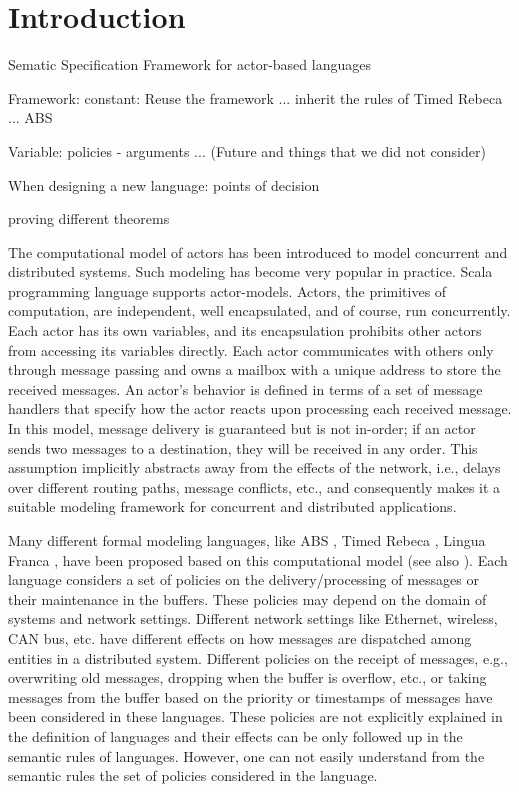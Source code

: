 \section{Introduction}

Sematic Specification Framework for actor-based languages

Framework:
constant: Reuse the framework ...
inherit the rules of Timed Rebeca ... ABS 

Variable: policies - arguments ...
(Future and things that we did not consider)

When designing a new language: points of decision 

proving different theorems

The computational model of actors \cite{Hewitt77,Agha90} has been introduced to model concurrent and distributed systems. Such modeling has become very popular in practice. Scala programming language supports actor-models. Actors, the primitives of computation, are independent, well encapsulated, and of course, run concurrently. Each actor has its own variables, and its encapsulation prohibits other actors from accessing its variables directly. Each actor communicates with others only through message passing and owns a mailbox with a unique address to store the received messages. An actor's behavior is defined in terms of a set of message handlers that specify how the actor reacts upon processing each received message. In this model, message delivery is guaranteed but is not in-order; if an actor sends two messages to a destination, they will be received in any order. This assumption implicitly abstracts away from the effects of the network, i.e., delays over different routing paths, message conflicts, etc., and consequently makes it a suitable modeling framework for concurrent and distributed applications. 


Many different formal modeling languages, like ABS \cite{ABS}, Timed Rebeca \cite{SirjaniK16}, Lingua Franca \cite{DBLP:conf/cyphy/LohstrohRGDCLS19}, have been proposed based on this computational model (see also \cite{survay}). Each language considers a set of policies on the delivery/processing of messages or their maintenance in the buffers. These policies may depend on the domain of systems and network settings. Different network settings like Ethernet, wireless, CAN bus, etc. have different effects on how messages are dispatched among entities in a distributed system. Different policies on the receipt of messages, e.g., overwriting old messages, dropping when the buffer is overflow, etc., or taking messages from the buffer based on the priority or timestamps of messages have been considered in these languages. These policies are not explicitly explained in the definition of languages and their effects can be only followed up in the semantic rules of languages. However, one can not easily understand from the semantic rules the set of policies considered in the language. %


